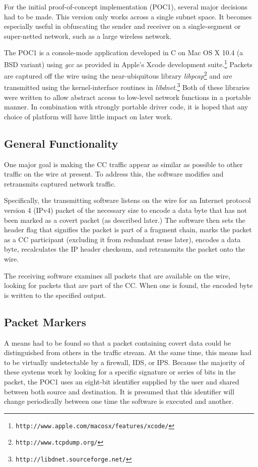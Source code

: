 \documentclass[letterpaper,10pt,draft]{article}
\begin{document}
For the initial proof-of-concept implementation (POC1), several major
decisions had to be made.  This version only works across a single
subnet space.  It becomes especially useful in obfuscating the sender
and receiver on a single-segment or super-netted network, such as a
large wireless network.

The POC1 is a console-mode application developed in C on Mac OS X 10.4
(a BSD variant) using \textit{gcc} as provided in Apple's Xcode
development
suite.\footnote{\texttt{http://www.apple.com/macosx/features/xcode/}}
Packets are captured off the wire using the near-ubiquitous library
\textit{libpcap}\footnote{\texttt{http://www.tcpdump.org/}} and are
transmitted using the kernel-interface routines in
\textit{libdnet}.\footnote{\texttt{http://libdnet.sourceforge.net/}}
Both of these libraries were written to allow abstract access to
low-level network functions in a portable manner.  In combination with
strongly portable driver code, it is hoped that any choice of platform
will have little impact on later work.

\subsection{General Functionality}

One major goal is making the CC traffic appear as similar as
possible to other traffic on the wire at present.  To address this,
the software modifies and retransmits captured network traffic.

Specifically, the transmitting software listens on the wire for an
Internet protocol version 4 (IPv4) packet of the necessary size to
encode a data byte that has not been marked as a covert packet (as
described later.)  The software then sets the header flag that
signifies the packet is part of a fragment chain, marks the packet as
a CC participant (excluding it from redundant reuse later), encodes a
data byte, recalculates the IP header checksum, and retransmits the
packet onto the wire.

The receiving software examines all packets that are available on the
wire, looking for packets that are part of the CC.  When one is found,
the encoded byte is written to the specified output.

\subsection{Packet Markers}

A means had to be found so that a packet containing covert data could
be distinguished from others in the traffic stream.  At the same time,
this means had to be virtually undetectable by a firewall, IDS, or
IPS.  Because the majority of these systems work by looking for a
specific signature or series of bits in the packet, the POC1 uses an
eight-bit identifier supplied by the user and shared between both
source and destination.  It is presumed that this identifier will
change periodically between one time the software is executed and
another.
\end{document}
